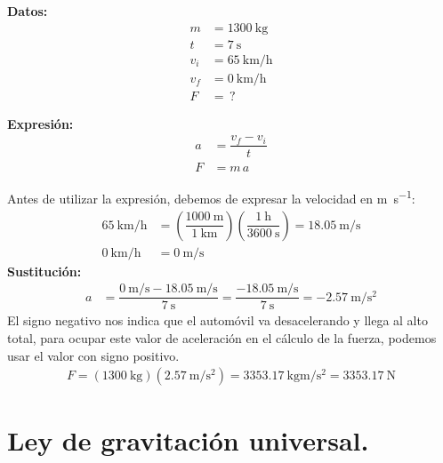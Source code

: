 \documentclass[14pt]{extarticle}
\begin{document}
\begin{minipage}[t]{0.3\linewidth}
\textbf{Datos:}
\begin{align*}
m &= \SI{1300}{\kilo\gram} \\
t &= \SI{7}{\second} \\
v_{i} &= \SI{65}{\kilo\meter\per\hour} \\
v_{f} &= \SI{0}{\kilo\meter\per\hour} \\
F &= \, ?
\end{align*}
\end{minipage}
\hspace{1cm}
\begin{minipage}[t]{0.3\linewidth}
\textbf{Expresión:}
\begin{align*}
a &= \dfrac{v_{f} - v_{i}}{t} \\[0.5em]
F &= m \, a
\end{align*}
\end{minipage}

\vspace*{0.4cm}
Antes de utilizar la expresión, debemos de expresar la velocidad en \si{\meter\per\second}:
\begin{align*}
\SI[per-mode=fraction]{65}{\kilo\meter\per\hour} &= \left( \dfrac{\SI{1000}{\meter}}{\SI{1}{\kilo\meter}} \right) \left( \dfrac{\SI{1}{\hour}}{\SI{3600}{\second}} \right) = \SI[per-mode=fraction]{18.05}{\meter\per\second} \\[0.5em]
\SI[per-mode=fraction]{0}{\kilo\meter\per\hour} &= \SI[per-mode=fraction]{0}{\meter\per\second}
\end{align*}
\textbf{Sustitución:}
\begin{align*}
a &= \dfrac{\displaystyle \SI[per-mode=fraction]{0}{\meter\per\second} - \SI[per-mode=fraction]{18.05}{\meter\per\second}}{\SI{7}{\second}} = \dfrac{\displaystyle - \SI[per-mode=fraction]{18.05}{\meter\per\second}}{\SI{7}{\second}} = - \SI[per-mode=fraction]{2.57}{\meter\per\square\second}
\end{align*}
El signo negativo nos indica que el automóvil va desacelerando y llega al alto total, para ocupar este valor de aceleración en el cálculo de la fuerza, podemos usar el valor con signo positivo.
\begin{align*}
F = (\SI{1300}{\kilo\gram}) \left( \SI[per-mode=fraction]{2.57}{\meter\per\square\second} \right) = \SI[per-mode=fraction]{3353.17}{\kilo\gram\meter\per\square\second} = \SI{3353.17}{\newton}
\end{align*}
\section{Ley de gravitación universal.}
\end{document}
